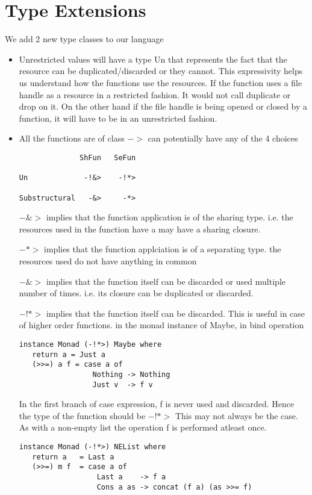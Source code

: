 \chapter{Type Extensions}

We add 2 new type classes to our language
\begin{itemize}
\item Unrestricted values will have a type Un
  that represents the fact that the resource can be
  duplicated/discarded or they cannot.
  This expressivity helps us understand how the functions
  use the resources. If the function uses a file handle as a resource
  in a restricted fashion. It would not call duplicate or drop on it.
  On the other hand if the file handle is being opened or closed
  by a function, it will have to be in an unrestricted fashion.
\item All the functions are of class $->$ can potentially have any of the 4 choices
\begin{verbatim}
              ShFun   SeFun

Un             -!&>    -!*>

Substructural   -&>     -*>
\end{verbatim}
  $-\&>$ implies that the function application is of the sharing type.
  i.e. the resources used in the function have a may have a sharing closure.

  $-*>$ implies that the function applciation is of a separating type.
  the resources used do not have anything in common

  $-\!\&>$ implies that the function itself can be discarded
  or used multiple number of times. i.e. its closure
  can be duplicated or discarded.

  $-!*>$ implies that the function itself can be discarded.
  This is useful in case of higher order functions. in the monad instance
  of Maybe, in bind operation

\begin{verbatim}
instance Monad (-!*>) Maybe where
   return a = Just a
   (>>=) a f = case a of
                 Nothing -> Nothing
                 Just v  -> f v
\end{verbatim}

  In the first branch of case expression, f is never used and discarded. Hence
  the type of the function should be $-!*>$
  This may not always be the case. As with a non-empty list
  the operation f is performed atleast once.

\begin{verbatim}
instance Monad (-!*>) NEList where
   return a   = Last a
   (>>=) m f  = case a of
                  Last a    -> f a
                  Cons a as -> concat (f a) (as >>= f)
\end{verbatim}

\end{itemize}


